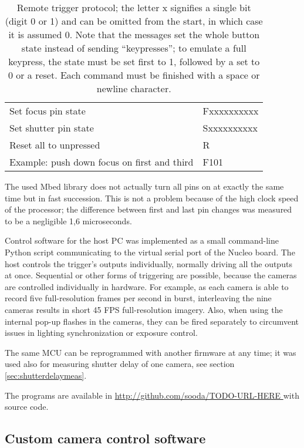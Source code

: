 \begin{table}[h]
	\centering
	\begin{tabular}{l l}
		Set focus pin state & Fxxxxxxxxxx\\
		Set shutter pin state & Sxxxxxxxxxx\\
		Reset all to unpressed & R\\
		Example: push down focus on first and third & F101\\
	\end{tabular}
	\caption{
		Remote trigger protocol; the letter x signifies a single bit (digit 0 or 1) and can be omitted from the start, in which case it is assumed 0.
		Note that the messages set the whole button state instead of sending ``keypresses'';
		to emulate a full keypress, the state must be set first to 1, followed by a set to 0 or a reset.
		Each command must be finished with a space or newline character.
	}
	\label{tab:triggerprotocol}
\end{table}

The used Mbed library does not actually turn all pins on at exactly the same time but in fast succession.
This is not a problem because of the high clock speed of the processor;
the difference between first and last pin changes was measured to be a negligible 1,6 microseconds.

Control software for the host PC was implemented as a small command-line Python script communicating to the virtual serial port of the Nucleo board.
The host controls the trigger's outputs individually, normally driving all the outputs at once.
Sequential or other forms of triggering are possible, because the cameras are controlled individually in hardware.
For example, as each camera is able to record five full-resolution frames per second in burst, interleaving the nine cameras results in short 45 FPS full-resolution imagery.
Also, when using the internal pop-up flashes in the cameras, they can be fired separately to circumvent issues in lighting synchronization or exposure control.

The same MCU can be reprogrammed with another firmware at any time; it was used also for measuring shutter delay of one camera, see section \ref{sec:shutterdelaymeas}.

The programs are available in \url { http://github.com/sooda/TODO-URL-HERE } with source code.


\subsection{Custom camera control software} %

